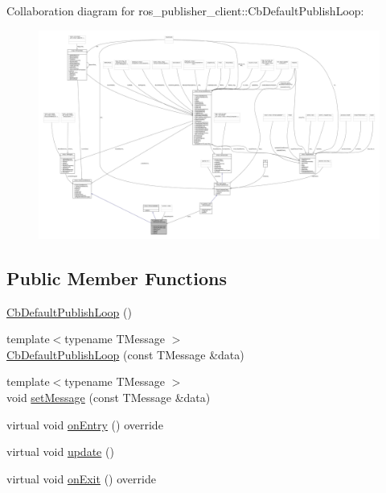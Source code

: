 Collaboration diagram for ros\+\_\+publisher\+\_\+client\+:\+:Cb\+Default\+Publish\+Loop\+:\nopagebreak
\begin{figure}[H]
\begin{center}
\leavevmode
\includegraphics[width=350pt]{classros__publisher__client_1_1CbDefaultPublishLoop__coll__graph}
\end{center}
\end{figure}
\subsection*{Public Member Functions}
\begin{DoxyCompactItemize}
\item 
\hyperlink{classros__publisher__client_1_1CbDefaultPublishLoop_adef5a847465f4c7f399a25ce37ab2fe5}{Cb\+Default\+Publish\+Loop} ()
\item 
{\footnotesize template$<$typename T\+Message $>$ }\\\hyperlink{classros__publisher__client_1_1CbDefaultPublishLoop_ac7b6e38399dae0fb03f81f23b7de5124}{Cb\+Default\+Publish\+Loop} (const T\+Message \&data)
\item 
{\footnotesize template$<$typename T\+Message $>$ }\\void \hyperlink{classros__publisher__client_1_1CbDefaultPublishLoop_a8bba9039f6a6841c21e9bc89c2fd8ab7}{set\+Message} (const T\+Message \&data)
\item 
virtual void \hyperlink{classros__publisher__client_1_1CbDefaultPublishLoop_ada860aab5d8887e8671a6ae7f4b22e76}{on\+Entry} () override
\item 
virtual void \hyperlink{classros__publisher__client_1_1CbDefaultPublishLoop_aac7546e32e37fd833eac47d3976463b3}{update} ()
\item 
virtual void \hyperlink{classros__publisher__client_1_1CbDefaultPublishLoop_a47605e0cb9236077c9d9b0c42db9708c}{on\+Exit} () override
\end{DoxyCompactItemize}
